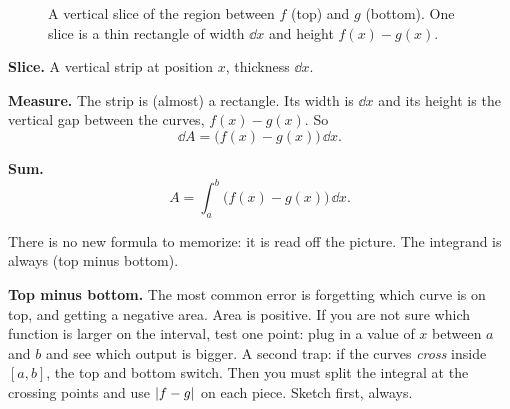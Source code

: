 \begin{figure}[H]
\centering
{}
\caption{A vertical slice of the region between $f$ (top) and $g$ (bottom). One
slice is a thin rectangle of width $\dd x$ and height $f(x)-g(x)$.}
\label{ch26:fig-area}
\end{figure}

\textbf{Slice.} A vertical strip at position $x$, thickness $\dd x$.

\textbf{Measure.} The strip is (almost) a rectangle. Its width is $\dd x$ and its
height is the vertical gap between the curves, $f(x)-g(x)$. So
\[
  \dd A = \bigl(f(x)-g(x)\bigr)\,\dd x.
\]

\textbf{Sum.}
\[
  \boxed{\,A = \int_a^b \bigl(f(x)-g(x)\bigr)\,\dd x.\,}
\]

There is no new formula to memorize: it is read off the picture. The integrand is
always (top minus bottom).

\begin{trapbox}
\textbf{Top minus bottom.} The most common error is forgetting which curve is on
top, and getting a negative area. Area is
positive. If you are not sure which function is larger on the interval, test one
point: plug in a value of $x$ between $a$ and $b$ and see which output is bigger.
A second trap: if the curves \emph{cross} inside $[a,b]$, the top and
bottom switch. Then you must split the integral at the crossing points and use
$\lvert f-g\rvert$ on each piece. Sketch first, always.
\end{trapbox}


